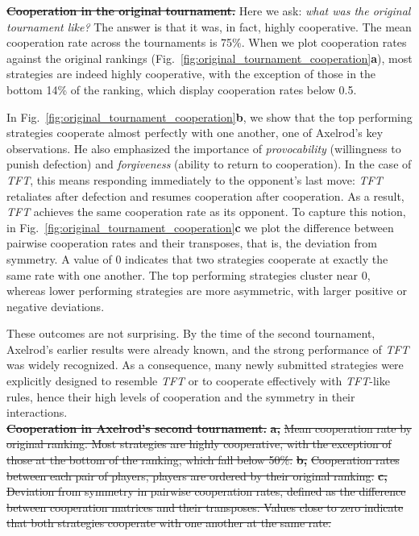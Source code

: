 \documentclass{article}
\newcommand{\TFT}{\emph{TFT}}
\providecommand{\DIFdeltex}[1]{{\protect\color{red}\sout{#1}}}                      %
\providecommand{\DIFdelbegin}{} %
\providecommand{\DIFdelend}{} %
\providecommand{\DIFdelFL}[1]{\DIFdel{#1}} %
\providecommand{\DIFdel}[1]{\texorpdfstring{\DIFdeltex{#1}}{}} %
\newcommand{\DIFscaledelfig}{0.5}
\newlength{\DIFdelgraphicswidth} %
\newlength{\DIFdelgraphicsheight} %
\newcommand{\DIFdelincludegraphics}[2][]{%
\sbox{\DIFdelgraphicsbox}{\DIFOincludegraphics[#1]{#2}}%
\settoboxwidth{\DIFdelgraphicswidth}{\DIFdelgraphicsbox} %
\settoboxtotalheight{\DIFdelgraphicsheight}{\DIFdelgraphicsbox} %
\scalebox{\DIFscaledelfig}{%
\parbox[b]{\DIFdelgraphicswidth}{\usebox{\DIFdelgraphicsbox}\\[-\baselineskip] \rule{\DIFdelgraphicswidth}{0em}}\llap{\resizebox{\DIFdelgraphicswidth}{\DIFdelgraphicsheight}{%
\setlength{\unitlength}{\DIFdelgraphicswidth}%
\begin{picture}(1,1)%
\thicklines\linethickness{2pt} %
{\color[rgb]{1,0,0}\put(0,0){\framebox(1,1){}}}%
{\color[rgb]{1,0,0}\put(0,0){\line( 1,1){1}}}%
{\color[rgb]{1,0,0}\put(0,1){\line(1,-1){1}}}%
\end{picture}%
}\hspace*{3pt}}} %
} %
\DeclareRobustCommand{\DIFdelbegin}{\DIFOdelbegin \let\includegraphics\DIFdelincludegraphics} %
\DeclareRobustCommand{\DIFdelend}{\DIFOaddend \let\includegraphics\DIFOincludegraphics} %
\begin{document}
\DIFdelbegin %
\textbf{\DIFdel{Cooperation in the original tournament.}}
\DIFdelend Here we ask: \emph{what was the original tournament like?} The answer is that it
was, in fact, highly cooperative. The mean cooperation rate across the
tournaments is 75\%. When we plot cooperation rates against the original
rankings (Fig.~\ref{fig:original_tournament_cooperation}\textbf{a}), most strategies are
indeed highly cooperative, with the exception of those in the bottom 14\% of the
ranking, which display cooperation rates below 0.5.

In Fig.~\ref{fig:original_tournament_cooperation}\textbf{b}, we show that the
top performing strategies cooperate almost perfectly with one another, one of
Axelrod's key observations. He also emphasized the importance of
\emph{provocability} (willingness to punish defection) and \emph{forgiveness}
(ability to return to cooperation). In the case of \TFT, this means responding
immediately to the opponent's last move: \TFT{} retaliates after defection and
resumes cooperation after cooperation. As a result, \TFT{} achieves
the same cooperation rate as its opponent. To capture this notion, in
Fig.~\ref{fig:original_tournament_cooperation}\textbf{c} we plot the difference between
pairwise cooperation rates and their transposes, that is, the deviation from
symmetry. A value of 0 indicates that two strategies cooperate at exactly the
same rate with one another. The top performing strategies cluster near 0,
whereas lower performing strategies are more asymmetric, with larger positive or
negative deviations.

These outcomes are not surprising. By the time of the second tournament,
Axelrod's earlier results were already known, and the strong performance of
\TFT{} was widely recognized. As a consequence, many newly submitted strategies
were explicitly designed to resemble \TFT{} or to cooperate effectively with
\TFT{}-like rules, hence their high levels of cooperation and the
symmetry in their interactions.\\

\DIFdelbegin %
{%
\textbf{\DIFdelFL{Cooperation in Axelrod's second tournament.}}
\textbf{\DIFdelFL{a,}} %
\DIFdelFL{Mean cooperation rate by original ranking. Most strategies are highly
cooperative, with the exception of those at the bottom of the ranking, which fall
below 50\%. }\textbf{\DIFdelFL{b,}} %
\DIFdelFL{Cooperation rates between each pair of players, players
are ordered by their original ranking. }\textbf{\DIFdelFL{c,}} %
\DIFdelFL{Deviation from symmetry in
pairwise cooperation rates, defined as the difference between cooperation matrices
and their transposes. Values close to zero indicate that both strategies cooperate
with one another at the same rate.}}
\end{document}
